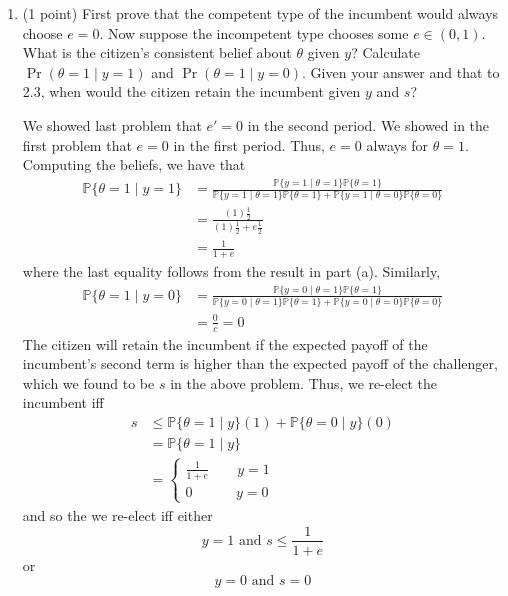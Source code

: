 \documentclass[11pt]{article}
\newcommand{\bbP}{\mathbb{P}}
\begin{document}
\begin{enumerate}
\begin{solution}
    The expected payoff for voting the challenger into office is 
    \begin{align*}
        \boxed{\bbP\{y' = 1\mid s\}(1) + \bbP\{y' = 0 \mid s\}(0) = \bbP\{\theta' = 1 \mid s\} = s }
    \end{align*}
\end{solution}
        \item (1 point) First prove that the competent type of the incumbent would always choose $e = 0$. Now suppose the incompetent type chooses some $e \in (0, 1)$. What is the citizen’s consistent belief about $\theta$ given $y$? Calculate $\Pr(\theta = 1 \mid y = 1)$ and $\Pr(\theta = 1 \mid y = 0)$. Given your answer and that to 2.3, when would the citizen retain the incumbent given $y$ and
 $s$?
        \begin{solution}
            We showed last problem that $e' = 0$ in the second period. We showed in the first problem that $e = 0$ in the first period. Thus, $e = 0$ always for $\theta = 1.$ Computing the beliefs, we have that 
            \begin{align*}
                \bbP\{\theta = 1 \mid y = 1\} &= \frac{\bbP\{y = 1 \mid \theta = 1\}\bbP\{\theta = 1\}}{\bbP\{y = 1 \mid \theta = 1\}\bbP\{\theta = 1\} + \bbP\{y = 1 \mid \theta = 0\}\bbP\{\theta = 0\}}\\
                &= \frac{(1) \frac{1}{2}}{(1)\frac{1}{2} + e \frac{1}{2}}\\
                &= \boxed{\frac{1}{1 + e}}
            \end{align*}
            where the last equality follows from the result in part (a). Similarly,
            \begin{align*}
                \bbP\{\theta = 1 \mid y  =0\} &= \frac{\bbP\{y = 0 \mid \theta = 1\}\bbP\{\theta= 1\}}{\bbP\{y = 0 \mid \theta = 1\}\bbP\{\theta= 1\} + \bbP\{y = 0 \mid \theta = 0\}\bbP\{\theta = 0\}}\\
                &= \frac{0}{c} = \boxed{0}
            \end{align*}
            The citizen will retain the incumbent if the expected payoff of the incumbent's second term is higher than the expected payoff of the challenger, which we found to be $s$ in the above problem. Thus, we re-elect the incumbent iff
            \begin{align*}
            s &\leq \bbP\{\theta = 1 \mid y\}(1) + \bbP\{\theta = 0 \mid y\}(0)\\ &= \bbP\{\theta = 1 \mid y\}\\
            &= \begin{cases}
                \frac{1}{1 + e}\qquad y = 1\\
                0 \qquad \,\:\:\:\;y = 0
            \end{cases}
            \end{align*}
            and so the we re-elect iff either
            \[\boxed{y = 1\text{ and } s\leq \frac{1}{1 + e}}\]
            or 
            \[\boxed{y = 0 \text{ and } s = 0}\]
        \end{solution}


\end{enumerate}
\end{document}

